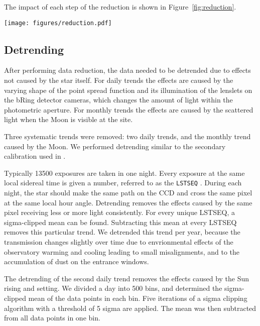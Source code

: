 \documentclass{aa}
\begin{document}
The impact of each step of the reduction is shown in Figure~\ref{fig:reduction}.

\begin{figure*}
    \centering
    \texttt{[image: figures/reduction.pdf]}
    \caption{The first three steps of the data reduction are shown here.
    The first plot shows the raw data that was saved by bRing.
    The second plot shows the data without the long exposures.
    Lastly, the data without the bad photometry and astrometry flags is plotted.
    The time is displayed on the horizontal axis in Julian Date and the apparent magnitude is displayed on the vertical axis.}
    \label{fig:reduction}
\end{figure*}

\subsection{Detrending}

After performing data reduction, the data needed to be detrended due to effects not caused by the star itself.
%
For daily trends the effects are caused by the varying shape of the point spread function and its illumination of the lenslets on the bRing detector cameras, which changes the amount of light within the photometric aperture.
%
For monthly trends the effects are caused by the scattered light when the Moon is visible at the site.

Three systematic trends were removed: two daily trends, and the monthly trend caused by the Moon.
%
We performed detrending similar to the secondary calibration used in \cite{Talens_2018}.

Typically 13500 exposures are taken in one night.
%
Every exposure at the same local sidereal time is given a number, referred to as the {\tt LSTSEQ} \citep{Talens_2018}.
%
During each night, the star should make the same path on the CCD and cross the same pixel at the same local hour angle.
%
Detrending removes the effects caused by the same pixel receiving less or more light consistently.
%
For every unique LSTSEQ, a sigma-clipped mean can be found.
%
Subtracting this mean at every LSTSEQ removes this particular trend.
%
We detrended this trend per year, because the transmission changes slightly over time due to envrionmental effects of the observatory warming and cooling leading to small misalignments, and to the accumulation of dust on the entrance windows.

The detrending of the second daily trend removes the effects caused by the Sun rising and setting.
%
We divided a day into 500 bins, and determined the sigma-clipped mean of the data points in each bin.
%
Five iterations of a sigma clipping algorithm with a threshold of 5 sigma are applied.
%
%
The mean was then subtracted from all data points in one bin.
\end{document}

